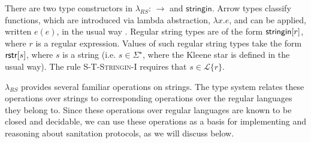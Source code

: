 \documentclass[10pt]{sigplanconf}
\newcommand{\todo}[1]{{\color{red} #1}}
\theoremstyle{definition}
\newcommand{\Lagr}{\mathcal{L}}
\newcommand{\lang}[1]{\Lagr\{#1\}}
\newcommand{\lambdas}{\lambda_{RS}}
\newcommand{\sistr}[1]{{\sf rstr}[#1]}   \newcommand{\rstr}[1]{{\sf rstr}[#1]} %
\newcommand{\strin}[1]{\sistr{#1}}
\newcommand{\stringin}[1]{{\sf stringin}[#1]}
\begin{document}
There are two type constructors in $\lambdas$: $\rightarrow$ and $\textsf{stringin}$. Arrow types classify functions, which are introduced via lambda abstraction, $\lambda x.e$, and can be applied, written $e(e)$, in the usual way \cite{pfpl}. Regular string types are of the form $\stringin{r}$, where $r$ is a regular expression. Values of such regular string types take the form $\strin{s}$, where $s$ is a string (i.e. $s \in \Sigma^\star$, where the Kleene star is defined in the usual way). The rule \textsc{S-T-Stringin-I} requires that $s \in \lang{r}$.


$\lambdas$ provides several familiar operations on strings. The type system  relates these operations over strings to corresponding operations over the  regular languages they belong to. 
Since these operations over regular languages are known to be closed and decidable, we can use these operations as a basis for implementing and reasoning about sanitation protocols, as we will discuss below.


\end{document}
